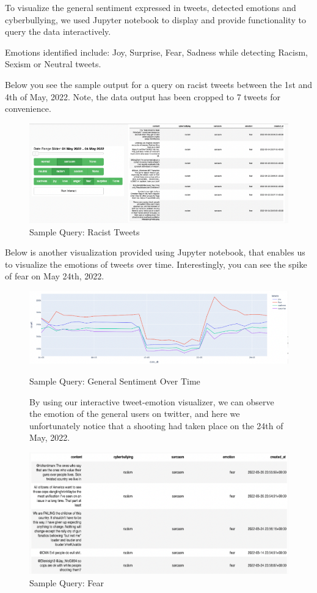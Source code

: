 \documentclass[a4paper,12pt]{article}
\begin{document}
To visualize the general sentiment expressed in tweets, detected emotions and cyberbullying, we used Jupyter notebook to
display and provide functionality to query the data interactively.

Emotions identified include: Joy, Surprise, Fear, Sadness while detecting Racism, Sexism or Neutral tweets.

Below you see the sample output for a query on racist tweets between the 1st and 4th of May, 2022. Note, the data output
has been cropped to 7 tweets for convenience.

\begin{figure}[h]
	\centering
	\includegraphics[width=\textwidth]{racism.png}
	\caption{Sample Query: Racist Tweets}
	\label{fig:Racist-Tweet-Query}
\end{figure}

Below is another visualization provided using Jupyter notebook, that enables us to visualize the emotions of tweets over time.
Interestingly, you can see the spike of fear on May 24th, 2022.

\begin{figure}[h]
{\centering
	\includegraphics[width=\textwidth]{graph.png}
	\caption{Sample Query: General Sentiment Over Time}
	\label{fig:Emotion-Time-Query}
}
	\vspace{5mm} %
By using our interactive tweet-emotion visualizer, we can
observe the emotion of the general users on twitter, and here we unfortunately notice that a shooting had taken place
on the 24th of May, 2022.
	{
	\centering
	\includegraphics[width=\textwidth]{graphTweets.png}
	\caption{Sample Query: Fear}
	\label{fig:Fear-Query}
}
\end{figure}
\end{document}
